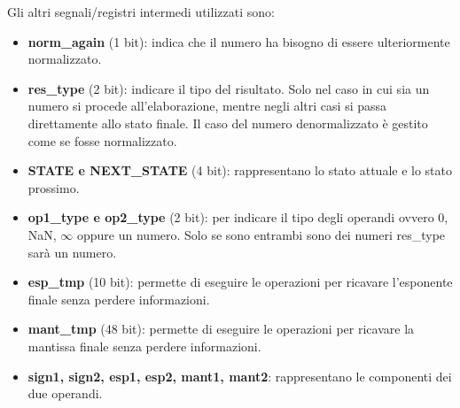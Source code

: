 \documentclass[]{IEEEtran}
\begin{document}
Gli altri segnali/registri intermedi utilizzati sono:
\begin{itemize}
    \item \textbf{norm\_again} (1 bit): indica che il numero ha bisogno di essere ulteriormente normalizzato.
    \item \textbf{res\_type} (2 bit): indicare il tipo del risultato. Solo nel caso in cui sia un numero si procede all'elaborazione, mentre negli altri casi si passa direttamente allo stato finale. Il caso del numero denormalizzato è gestito come se fosse normalizzato.
    \item \textbf{STATE e NEXT\_STATE} (4 bit): rappresentano lo stato attuale e lo stato prossimo.
    \item \textbf{op1\_type e op2\_type} (2 bit): per indicare il tipo degli operandi ovvero 0, NaN, $\infty$ oppure un numero. Solo se sono entrambi sono dei numeri res\_type sarà un numero.
    \item \textbf{esp\_tmp} (10 bit): permette di eseguire le operazioni per ricavare l'esponente finale senza perdere informazioni.
    \item \textbf{mant\_tmp} (48 bit): permette di eseguire le operazioni per ricavare la mantissa finale senza perdere informazioni.
    \item \textbf{sign1, sign2, esp1, esp2, mant1, mant2}: rappresentano le componenti dei due operandi.
\end{itemize}
\end{document}

